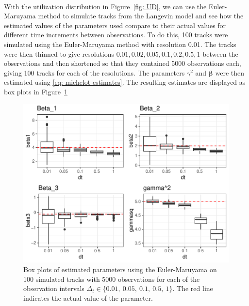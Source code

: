 \

With the utilization distribution in Figure~\ref{fig: UD}, we can use the Euler-Maruyama method to simulate tracks from the Langevin model and see how the estimated values of the parameters used compare to their actual values for different time increments between observations. To do this, 100 tracks were simulated using the Euler-Maruyama method with resolution 0.01. The tracks were then thinned to give resolutions $0.01, 0.02, 0.05, 0.1, 0.2, 0.5, 1$ between the observations and then shortened so that they contained 5000 observations each, giving 100 tracks for each of the resolutions. The parameters $\gamma^2$ and $\bm \beta$ were then estimated using \eqref{eq: michelot estimates}. The resulting estimates are displayed as box plots in Figure~\ref{fig:EM_thin_boxplot}


\begin{figure}[H]
    \centering
    \includegraphics[width=\linewidth]{Images/ch3/varying dt EM boxplot.pdf}
    \caption[Euler-Mauryama estimates]{Box plots of estimated parameters using the Euler-Maruyama on 100 simulated tracks with 5000 observations for each of the observation intervals $\Delta_t \in \{0.01, \ 0.05, \ 0.1, \ 0.5, \ 1\}$. The red line indicates the actual value of the parameter.}
    \label{fig:EM_thin_boxplot}
\end{figure}


